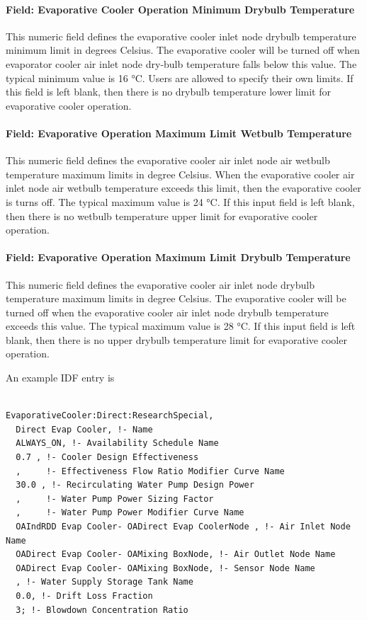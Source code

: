 \paragraph{Field: Evaporative Cooler Operation Minimum Drybulb Temperature}\label{field-evaporative-cooler-operation-minimum-drybulb-temperature}

This numeric field defines the evaporative cooler inlet node drybulb temperature minimum limit in degrees Celsius. The evaporative cooler will be turned off when evaporator cooler air inlet node dry-bulb temperature falls below this value. The typical minimum value is 16 °C. Users are allowed to specify their own limits. If this field is left blank, then there is no drybulb temperature lower limit for evaporative cooler operation.

\paragraph{Field: Evaporative Operation Maximum Limit Wetbulb Temperature}\label{field-evaporative-operation-maximum-limit-wetbulb-temperature}

This numeric field defines the evaporative cooler air inlet node air wetbulb temperature maximum limits in degree Celsius. When the evaporative cooler air inlet node air wetbulb temperature exceeds this limit, then the evaporative cooler is turns off. The typical maximum value is 24 °C. If this input field is left blank, then there is no wetbulb temperature upper limit for evaporative cooler operation.

\paragraph{Field: Evaporative Operation Maximum Limit Drybulb Temperature}\label{field-evaporative-operation-maximum-limit-drybulb-temperature}

This numeric field defines the evaporative cooler air inlet node drybulb temperature maximum limits in degree Celsius. The evaporative cooler will be turned off when the evaporative cooler air inlet node drybulb temperature exceeds this value. The typical maximum value is 28 °C. If this input field is left blank, then there is no upper drybulb temperature limit for evaporative cooler operation.

An example IDF entry is

\begin{lstlisting}

EvaporativeCooler:Direct:ResearchSpecial,
  Direct Evap Cooler, !- Name
  ALWAYS_ON, !- Availability Schedule Name
  0.7 , !- Cooler Design Effectiveness
  ,     !- Effectiveness Flow Ratio Modifier Curve Name
  30.0 , !- Recirculating Water Pump Design Power
  ,     !- Water Pump Power Sizing Factor
  ,     !- Water Pump Power Modifier Curve Name
  OAIndRDD Evap Cooler- OADirect Evap CoolerNode , !- Air Inlet Node Name
  OADirect Evap Cooler- OAMixing BoxNode, !- Air Outlet Node Name
  OADirect Evap Cooler- OAMixing BoxNode, !- Sensor Node Name
  , !- Water Supply Storage Tank Name
  0.0, !- Drift Loss Fraction
  3; !- Blowdown Concentration Ratio
\end{lstlisting}

